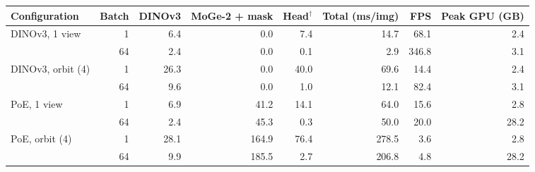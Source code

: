 \begin{tabular}{@{}l r rrr r r r@{}}
\toprule
Configuration & Batch & DINOv3 & MoGe-2 + mask & Head$^\dagger$ & Total (ms/img) & FPS & Peak GPU (GB) \\
\midrule
DINOv3, 1 view & 1 & 6.4 & 0.0 & 7.4 & 14.7 & 68.1 & 2.4 \\
 & 64 & 2.4 & 0.0 & 0.1 & 2.9 & 346.8 & 3.1 \\
DINOv3, orbit (4) & 1 & 26.3 & 0.0 & 40.0 & 69.6 & 14.4 & 2.4 \\
 & 64 & 9.6 & 0.0 & 1.0 & 12.1 & 82.4 & 3.1 \\
PoE, 1 view & 1 & 6.9 & 41.2 & 14.1 & 64.0 & 15.6 & 2.8 \\
 & 64 & 2.4 & 45.3 & 0.3 & 50.0 & 20.0 & 28.2 \\
PoE, orbit (4) & 1 & 28.1 & 164.9 & 76.4 & 278.5 & 3.6 & 2.8 \\
 & 64 & 9.9 & 185.5 & 2.7 & 206.8 & 4.8 & 28.2 \\
\bottomrule
\end{tabular}